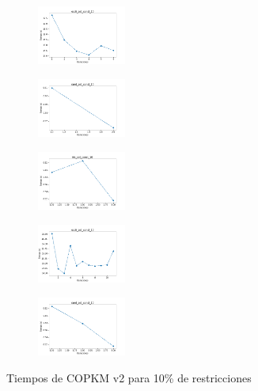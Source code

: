 \begin{figure}[H]
\begin{subfigure}
    \end{subfigure}
    \hfill
    \begin{subfigure}
        \centering
        \includegraphics[width=0.32\textwidth]{img/copkm2/ecoli_set_const_10_49258669_time.png}
    \end{subfigure}
    \hfill
    \begin{subfigure}
        \centering
        \includegraphics[width=0.32\textwidth]{img/copkm2/rand_set_const_10_49258669_time.png}
    \end{subfigure}
    \hfill
    \begin{subfigure}
        \centering
        \includegraphics[width=0.32\textwidth]{img/copkm2/iris_set_const_10_3773969821_time.png}
    \end{subfigure}
    \hfill
    \begin{subfigure}
        \centering
        \includegraphics[width=0.32\textwidth]{img/copkm2/ecoli_set_const_10_3773969821_time.png}
    \end{subfigure}
    \hfill
    \begin{subfigure}
        \centering
        \includegraphics[width=0.32\textwidth]{img/copkm2/rand_set_const_10_3773969821_time.png}
    \end{subfigure}
    \caption{Tiempos de COPKM v2 para 10\% de restricciones}
\end{figure}

